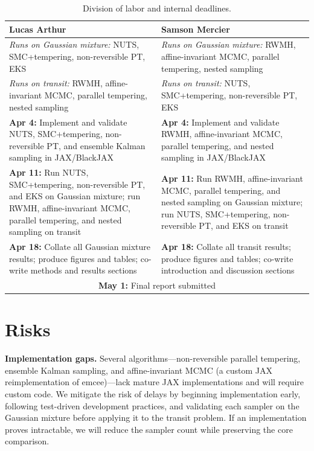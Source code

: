 \documentclass{article}
\begin{document}
\begin{table}[h]
\centering\small
\begin{tabular}{@{}p{}p{}@{}}
\toprule
\textbf{Lucas Arthur} & \textbf{Samson Mercier} \\
\midrule
\textit{Runs on Gaussian mixture:} NUTS, SMC+tempering, non-reversible PT, EKS &
\textit{Runs on Gaussian mixture:} RWMH, affine-invariant MCMC, parallel tempering, nested sampling \\[2pt]
\textit{Runs on transit:} RWMH, affine-invariant MCMC, parallel tempering, nested sampling &
\textit{Runs on transit:} NUTS, SMC+tempering, non-reversible PT, EKS \\
\midrule
\textbf{Apr 4:} Implement and validate NUTS, SMC+tempering, non-reversible PT, and ensemble Kalman sampling in JAX/BlackJAX &
\textbf{Apr 4:} Implement and validate RWMH, affine-invariant MCMC, parallel tempering, and nested sampling in JAX/BlackJAX \\[4pt]
\textbf{Apr 11:} Run NUTS, SMC+tempering, non-reversible PT, and EKS on Gaussian mixture; run RWMH, affine-invariant MCMC, parallel tempering, and nested sampling on transit &
\textbf{Apr 11:} Run RWMH, affine-invariant MCMC, parallel tempering, and nested sampling on Gaussian mixture; run NUTS, SMC+tempering, non-reversible PT, and EKS on transit \\[4pt]
\textbf{Apr 18:} Collate all Gaussian mixture results; produce figures and tables; co-write methods and results sections &
\textbf{Apr 18:} Collate all transit results; produce figures and tables; co-write introduction and discussion sections \\
\midrule
\multicolumn{2}{c}{\textbf{May 1:} Final report submitted} \\
\bottomrule
\end{tabular}
\caption{Division of labor and internal deadlines.}
\label{tab:plan}
\end{table}

\section*{Risks}

\textbf{Implementation gaps.} Several algorithms---non-reversible parallel tempering, ensemble Kalman sampling, and affine-invariant MCMC (a custom JAX reimplementation of emcee)---lack mature JAX implementations and will require custom code. We mitigate the risk of delays by beginning implementation early, following test-driven development practices, and validating each sampler on the Gaussian mixture before applying it to the transit problem. If an implementation proves intractable, we will reduce the sampler count while preserving the core comparison.
\end{document}
